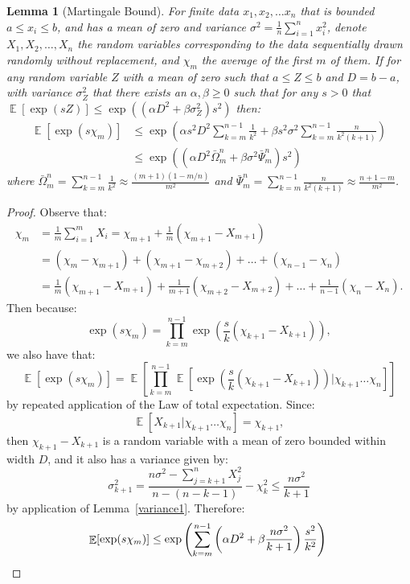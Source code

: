 \documentclass[]{interact}
\DeclareMathOperator{\E}{\mathbb{E}}
\theoremstyle{plain}%
\newtheorem{lemma}[Theorem]{Lemma}
\theoremstyle{definition}
\theoremstyle{remark}
\begin{document}
\begin{lemma}[Martingale Bound]\label{martingale0}
For finite data $x_1,x_2,\dots x_n$ that is bounded $a\le x_i\le b$, and has a mean of zero and variance $\sigma^2=\frac{1}{n}\sum_{i=1}^nx_i^2$, denote $X_1,X_2,\dots,X_n$ the random variables corresponding to the data sequentially drawn randomly without replacement, and $\chi_m$ the average of the first $m$ of them.
If for any random variable $Z$ with a mean of zero such that $a\le Z\le b$ and $D=b-a$, with variance $\sigma_Z^2$ that there exists an $\alpha, \beta \ge 0$ such that for any $s>0$ that $\E[\exp(sZ)]\le\exp((\alpha D^2 +\beta \sigma_Z^2) s^2)$ then:
\begin{align*}\E[\exp(s\chi_m)]&\le\exp\left(\alpha s^2D^2\sum_{k=m}^{n-1}\frac{1}{k^2} +\beta s^2\sigma^2 \sum_{k=m}^{n-1}\frac{n}{k^2(k+1)}\right)\\ &\le \exp((\alpha D^2\bar{\Omega}_m^n +\beta\sigma^2 \bar{\Psi}_m^n)s^2)\end{align*}
where $\bar{\Omega}_m^n = \sum_{k=m}^{n-1}\frac{1}{k^2}\approx \frac{(m+1)(1-m/n)}{m^2}$ and $\bar{\Psi}_m^n = \sum_{k=m}^{n-1}\frac{n}{k^2(k+1)}\approx \frac{n+1-m}{m^2}$.
\end{lemma}
\begin{proof}
Observe that:
\begin{align*}
\chi_m 
& =\frac{1}{m}\sum_{i=1}^{m}X_i = \chi_{m+1}+\frac{1}{m}(\chi_{m+1}-X_{m+1})\\
& =(\chi_m-\chi_{m+1})+(\chi_{m+1}-\chi_{m+2}) + \dots + (\chi_{n-1}-\chi_n)\\
& =\frac{1}{m}(\chi_{m+1}-X_{m+1})+\frac{1}{m+1}(\chi_{m+2}-X_{m+2}) + \dots + \frac{1}{n-1}(\chi_n-X_n).
\end{align*} 
Then because:
$$\exp(s\chi_m)=\prod_{k=m}^{n-1}\exp\left(\frac{s}{k}(\chi_{k+1}-X_{k+1})\right),$$
we also have that: 
$$\E[\exp(s\chi_m)]=\E\left[\prod_{k=m}^{n-1}\E\left[\exp\left(\frac{s}{k}(\chi_{k+1}-X_{k+1})\right)|\chi_{k+1}\dots \chi_n\right]\right]$$
by repeated application of the Law of total expectation. 
Since:
$$\E[X_{k+1}|\chi_{k+1}\dots \chi_n]=\chi_{k+1},$$ 
then $\chi_{k+1}-X_{k+1}$ is a random variable with a mean of zero bounded within width $D$, and it also has a variance given by: 
\begin{equation}\label{approx1} 
\sigma_{k+1}^2 = \frac{n\sigma^2-\sum_{j=k+1}^nX_j^2}{n-(n-k-1)} - \chi_k^2 \le \frac{n\sigma^2}{k+1}
\end{equation}
by application of Lemma~\ref{variance1}. 
Therefore: 
\[\E[\exp(s\chi_m)]\le\exp\left(\sum_{k=m}^{n-1}\left(\alpha D^2 +\beta \frac{n\sigma^2}{k+1}\right) \frac{s^2}{k^2}\right)\qedhere\]
\end{proof}
\end{document}
